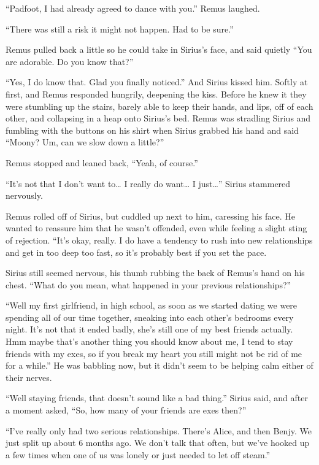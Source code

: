 \documentclass[12pt,twoside,openright]{memoir}
\begin{document}
``Padfoot, I had already agreed to dance with you.'' Remus laughed.

``There was still a risk it might not happen. Had to be sure.''

Remus pulled back a little so he could take in Sirius's face, and said quietly ``You are adorable. Do you know that?''

``Yes, I do know that. Glad you finally noticed.'' And Sirius kissed him. Softly at first, and Remus responded hungrily, deepening the kiss. Before he knew it they were stumbling up the stairs, barely able to keep their hands, and lips, off of each other, and collapsing in a heap onto Sirius's bed. Remus was stradling Sirius and fumbling with the buttons on his shirt when Sirius grabbed his hand and said ``Moony? Um, can we slow down a little?''

Remus stopped and leaned back, ``Yeah, of course.''

``It's not that I don't want to… I really do want… I just…'' Sirius stammered nervously.

Remus rolled off of Sirius, but cuddled up next to him, caressing his face. He wanted to reassure him that he wasn't offended, even while feeling a slight sting of rejection. ``It's okay, really. I do have a tendency to rush into new relationships and get in too deep too fast, so it's probably best if you set the pace.{\textquotedbl}

Sirius still seemed nervous, his thumb rubbing the back of Remus's hand on his chest. ``What do you mean, what happened in your previous relationships?''

``Well my first girlfriend, in high school, as soon as we started dating we were spending all of our time together, sneaking into each other's bedrooms every night. It's not that it ended badly, she's still one of my best friends actually. Hmm maybe that's another thing you should know about me, I tend to stay friends with my exes, so if you break my heart you still might not be rid of me for a while.'' He was babbling now, but it didn't seem to be helping calm either of their nerves. 

``Well staying friends, that doesn't sound like a bad thing.'' Sirius said, and after a moment asked, ``So, how many of your friends are exes then?''

``I've really only had two serious relationships. There's Alice, and then Benjy. We just split up about 6 months ago. We don't talk that often, but we've hooked up a few times when one of us was lonely or just needed to let off steam.''
\end{document}

